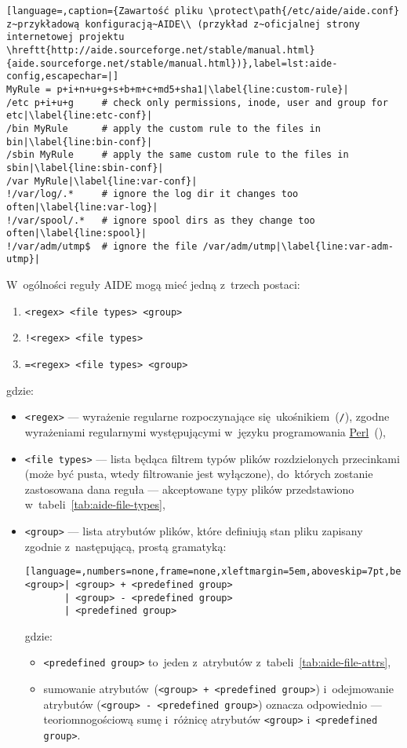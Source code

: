 \documentclass[thesis]{subfiles}
\begin{document}
\begin{lstlisting}[language=,caption={Zawartość pliku \protect\path{/etc/aide/aide.conf} z~przykładową konfiguracją~AIDE\\ (przykład z~oficjalnej strony internetowej projektu \hreftt{http://aide.sourceforge.net/stable/manual.html}{aide.sourceforge.net/stable/manual.html})},label=lst:aide-config,escapechar=|]
MyRule = p+i+n+u+g+s+b+m+c+md5+sha1|\label{line:custom-rule}|
/etc p+i+u+g     # check only permissions, inode, user and group for etc|\label{line:etc-conf}|
/bin MyRule      # apply the custom rule to the files in bin|\label{line:bin-conf}|
/sbin MyRule     # apply the same custom rule to the files in sbin|\label{line:sbin-conf}|
/var MyRule|\label{line:var-conf}|
!/var/log/.*     # ignore the log dir it changes too often|\label{line:var-log}|
!/var/spool/.*   # ignore spool dirs as they change too often|\label{line:spool}|
!/var/adm/utmp$  # ignore the file /var/adm/utmp|\label{line:var-adm-utmp}|
\end{lstlisting}

W~ogólności reguły AIDE mogą mieć jedną z~trzech postaci:\mynobreakpar
\begin{enumerate}
	\item \texttt{<regex> <file types> <group>}
	\item \texttt{!<regex> <file types>}
	\item \texttt{=<regex> <file types> <group>}
\end{enumerate}
gdzie:
\begin{itemize}
	\item \texttt{<regex>} --- wyrażenie regularne rozpoczynające się~ukośnikiem~(\texttt{/}), zgodne wyrażeniami regularnymi występującymi w~języku programowania \href{https://en.wikipedia.org/wiki/Perl}{Perl}~(),
	\item \texttt{<file types>} --- lista będąca filtrem typów plików rozdzielonych przecinkami (może być pusta, wtedy filtrowanie jest wyłączone), do~których zostanie zastosowana dana reguła --- akceptowane typy plików przedstawiono w~tabeli~\ref{tab:aide-file-types},
	\item \texttt{<group>} --- lista atrybutów plików, które definiują stan pliku zapisany zgodnie z~następującą, prostą gramatyką:
\begin{lstlisting}[language=,numbers=none,frame=none,xleftmargin=5em,aboveskip=7pt,belowskip=0pt]
<group>| <group> + <predefined group>
       | <group> - <predefined group>
       | <predefined group>
\end{lstlisting}
	gdzie:\mynobreakpar
	\begin{itemize}
		\item \texttt{<predefined group>} to~jeden z~atrybutów z~tabeli~\ref{tab:aide-file-attrs},
		\item sumowanie atrybutów~(\texttt{<group> + <predefined group>}) i~odejmowanie atrybutów (\texttt{<group> - <predefined~group>}) oznacza odpowiednio --- teoriomnogościową sumę i~różnicę atrybutów \texttt{<group>} i~\texttt{<predefined group>}.
	\end{itemize}
\end{itemize}
\end{document}
